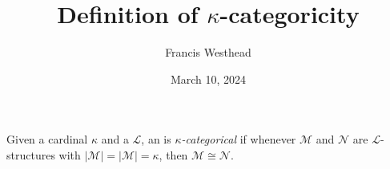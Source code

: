\documentclass[a4paper]{article}
\title{Definition of \(\kappa\)-categoricity}
\date{March 10, 2024}
\author{Francis Westhead}
\begin{document}
\maketitle
\par{
    Given a cardinal \(\kappa\) and a  \(\mathcal {L}\), an  is \emph{\(\kappa\)-categorical} if whenever \(\mathcal {M}\) and \(\mathcal {N}\) are \(\mathcal {L}\)-structures with \(| \mathcal {M}|=| \mathcal {M}|= \kappa\), then \(\mathcal {M}  \cong   \mathcal {N}\). 
}
\printbibliography
\end{document}
